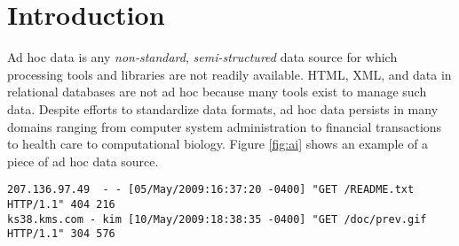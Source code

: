 \section{Introduction}


Ad hoc data is any {\em non-standard}, {\em semi-structured} 
data source for which processing tools and libraries are not
readily available. HTML, XML, and data in relational databases are not ad hoc because 
many tools exist to manage such data.
Despite efforts to standardize data formats, ad hoc data persists
in many domains ranging from computer system administration to 
financial transactions
 to health care to computational biology. Figure \ref{fig:ai} shows
an example of a piece of ad hoc data source.

\begin{figure*}
{\scriptsize
\begin{verbatim}
207.136.97.49  - - [05/May/2009:16:37:20 -0400] "GET /README.txt HTTP/1.1" 404 216
ks38.kms.com - kim [10/May/2009:18:38:35 -0400] "GET /doc/prev.gif HTTP/1.1" 304 576
\end{verbatim}
}
\caption{A Fragment of a Simple Web Server Log \ai{}}
\label{fig:ai}
\end{figure*}


